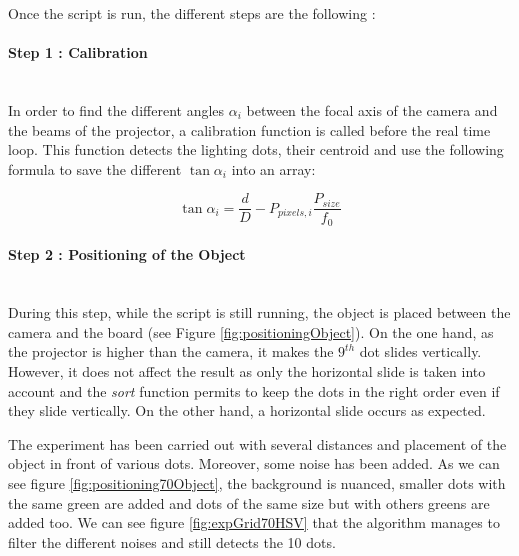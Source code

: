 Once the script is run, the different steps are the following :
\paragraph*{Step 1 : Calibration}
~~\\
In order to find the different angles $\alpha_i$ between the focal axis of the camera and the beams of the projector, a calibration function is called before the real time loop. This function detects the lighting dots, their centroid and use the following formula to save the different $\tan \alpha_i$ into an array:

\begin{equation*}
\tan \alpha_i = \frac{d}{D}-P_{pixels,i}\frac{P_{size}}{f_0}
\end{equation*}


\paragraph*{Step 2 : Positioning of the Object}
~~\\
During this step, while the script is still running, the object is placed between the camera and the board (see Figure \ref{fig:positioningObject}). On the one hand, as the projector is higher than the camera, it makes the $9^{th}$ dot slides vertically. However, it does not affect the result as only the horizontal slide is taken into account and the \emph{sort} function permits to keep the dots in the right order even if they slide vertically. On the other hand, a horizontal slide occurs as expected.

The experiment has been carried out with several distances and placement of the object in front of various dots. Moreover, some noise has been added. As we can see figure \ref{fig:positioning70Object}, the background is nuanced, smaller dots with the same green are added and dots of the same size but with others greens are added too. We can see figure \ref{fig:expGrid70HSV} that the algorithm manages to filter the different noises and still detects the 10 dots.



